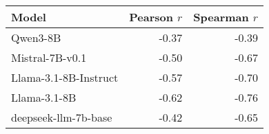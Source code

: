 \begin{tabular}{lrr} \toprule Model & Pearson \(r\) & Spearman \(r\) \\ \midrule Qwen3-8B & -0.37 & -0.39 \\ Mistral-7B-v0.1 & -0.50 & -0.67 \\ Llama-3.1-8B-Instruct & -0.57 & -0.70 \\ Llama-3.1-8B & -0.62 & -0.76 \\ deepseek-llm-7b-base & -0.42 & -0.65 \\ \bottomrule \end{tabular}